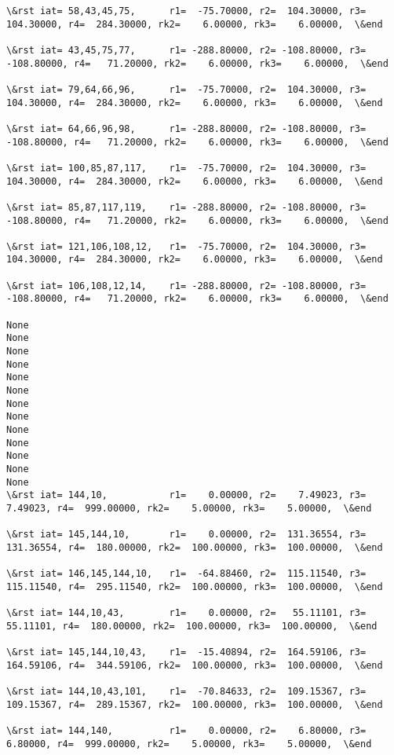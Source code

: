 \documentclass[11pt]{article}
\begin{document}
\begin{Verbatim}[commandchars=\\\{\}]
\&rst iat= 58,43,45,75,      r1=  -75.70000, r2=  104.30000, r3=  104.30000, r4=  284.30000, rk2=    6.00000, rk3=    6.00000,  \&end

\&rst iat= 43,45,75,77,      r1= -288.80000, r2= -108.80000, r3= -108.80000, r4=   71.20000, rk2=    6.00000, rk3=    6.00000,  \&end

\&rst iat= 79,64,66,96,      r1=  -75.70000, r2=  104.30000, r3=  104.30000, r4=  284.30000, rk2=    6.00000, rk3=    6.00000,  \&end

\&rst iat= 64,66,96,98,      r1= -288.80000, r2= -108.80000, r3= -108.80000, r4=   71.20000, rk2=    6.00000, rk3=    6.00000,  \&end

\&rst iat= 100,85,87,117,    r1=  -75.70000, r2=  104.30000, r3=  104.30000, r4=  284.30000, rk2=    6.00000, rk3=    6.00000,  \&end

\&rst iat= 85,87,117,119,    r1= -288.80000, r2= -108.80000, r3= -108.80000, r4=   71.20000, rk2=    6.00000, rk3=    6.00000,  \&end

\&rst iat= 121,106,108,12,   r1=  -75.70000, r2=  104.30000, r3=  104.30000, r4=  284.30000, rk2=    6.00000, rk3=    6.00000,  \&end

\&rst iat= 106,108,12,14,    r1= -288.80000, r2= -108.80000, r3= -108.80000, r4=   71.20000, rk2=    6.00000, rk3=    6.00000,  \&end

None
None
None
None
None
None
None
None
None
None
None
None
None
\&rst iat= 144,10,           r1=    0.00000, r2=    7.49023, r3=    7.49023, r4=  999.00000, rk2=    5.00000, rk3=    5.00000,  \&end

\&rst iat= 145,144,10,       r1=    0.00000, r2=  131.36554, r3=  131.36554, r4=  180.00000, rk2=  100.00000, rk3=  100.00000,  \&end

\&rst iat= 146,145,144,10,   r1=  -64.88460, r2=  115.11540, r3=  115.11540, r4=  295.11540, rk2=  100.00000, rk3=  100.00000,  \&end

\&rst iat= 144,10,43,        r1=    0.00000, r2=   55.11101, r3=   55.11101, r4=  180.00000, rk2=  100.00000, rk3=  100.00000,  \&end

\&rst iat= 145,144,10,43,    r1=  -15.40894, r2=  164.59106, r3=  164.59106, r4=  344.59106, rk2=  100.00000, rk3=  100.00000,  \&end

\&rst iat= 144,10,43,101,    r1=  -70.84633, r2=  109.15367, r3=  109.15367, r4=  289.15367, rk2=  100.00000, rk3=  100.00000,  \&end

\&rst iat= 144,140,          r1=    0.00000, r2=    6.80000, r3=    6.80000, r4=  999.00000, rk2=    5.00000, rk3=    5.00000,  \&end


\end{Verbatim}
\end{document}
